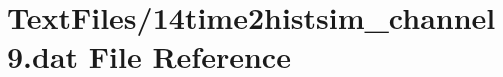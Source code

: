 \hypertarget{14time2histsim__channel9_8dat}{}\section{Text\+Files/14time2histsim\+\_\+channel9.dat File Reference}
\label{14time2histsim__channel9_8dat}
